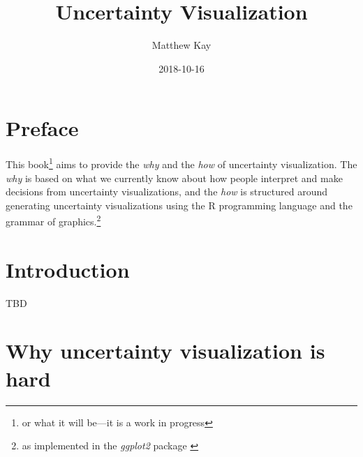 \documentclass[]{book}
\title{Uncertainty Visualization}
\author{Matthew Kay}
\date{2018-10-16}
\let\rmarkdownfootnote\footnote%
\def\footnote{\protect\rmarkdownfootnote}
\theoremstyle{definition}
\theoremstyle{definition}
\theoremstyle{definition}
\theoremstyle{remark}
\begin{document}
\maketitle

{
\setcounter{tocdepth}{1}
\tableofcontents
}
\hypertarget{preface}{%
\chapter*{Preface}\label{preface}}

This book\footnote{or what it will be---it is a work in progress} aims
to provide the \emph{why} and the \emph{how} of uncertainty
visualization. The \emph{why} is based on what we currently know about
how people interpret and make decisions from uncertainty visualizations,
and the \emph{how} is structured around generating uncertainty
visualizations using the R programming language and the grammar of
graphics.\footnote{as implemented in the \emph{ggplot2} package
  \citep{R-ggplot2}}

\hypertarget{ch-intro}{%
\chapter{Introduction}\label{ch-intro}}

TBD

\hypertarget{ch-why-hard}{%
\chapter{Why uncertainty visualization is hard}\label{ch-why-hard}}
\end{document}
